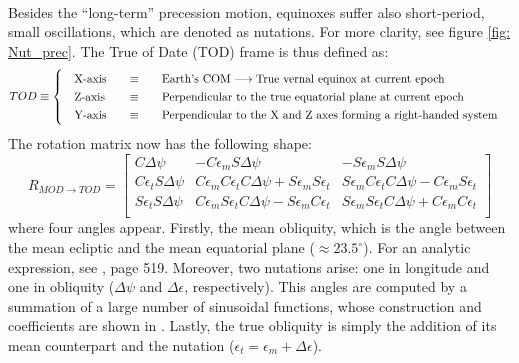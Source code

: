 		\FloatBarrier
		\subparagraph{ \\}
		\indent Besides the ``long-term'' precession motion, equinoxes suffer also short-period, small oscillations, which are denoted as nutations. For more clarity, see figure \ref{fig:	Nut_prec}. The True of Date (TOD) frame is thus defined as: \\
		\[
		\arraycolsep=10pt
		\def\arraystretch{1.3}
		TOD\equiv\left\{
		\begin{array}{lll}
		\text{X-axis} 	& \equiv 	& \text{Earth's COM} \longrightarrow \text{True vernal equinox at current epoch} \\
		\text{Z-axis} 	& \equiv 	& \text{Perpendicular to the true equatorial plane at current epoch} \\
		\text{Y-axis} 	& \equiv 	& \text{Perpendicular to the X and Z axes forming a right-handed system} \\
		\end{array}
		\right.
		\]
		\indent The rotation matrix now has the following shape:
		\begin{equation}
		R_{MOD\rightarrow TOD} = 
		\left[ 
		\begin{array}{ccc}
		C \Delta \psi 				& - C \epsilon_m S \Delta \psi 	& - S \epsilon_m S \Delta \psi \\
		C \epsilon_t S \Delta \psi 	& C \epsilon_m C \epsilon_t C \Delta \psi + S \epsilon_m S \epsilon_t & S \epsilon_m C \epsilon_t C \Delta \psi - C \epsilon_m S \epsilon_t \\
		S \epsilon_t S \Delta \psi 	& C \epsilon_m S \epsilon_t C \Delta \psi - S \epsilon_m C \epsilon_t & S \epsilon_m S \epsilon_t C \Delta \psi + C \epsilon_m C \epsilon_t \\
		\end{array}
		\right]
		\label{eq: R_MOD_TOD}
		\end{equation}
		\noindent where four angles appear. Firstly, the mean obliquity, which is the angle between the mean ecliptic and the mean equatorial plane ($\approx 23.5^{\circ}$). For an analytic expression, see \cite{Tapley}, page 519. Moreover, two nutations arise: one in longitude and one in obliquity ($\Delta \psi$ and $\Delta \epsilon$, respectively). This angles are computed by a summation of a large number of sinusoidal functions, whose construction and coefficients are shown in \cite{IERS_conventions}. Lastly, the true obliquity is simply the addition of its mean counterpart and the nutation ($\epsilon_t = \epsilon_m + \Delta \epsilon$).
